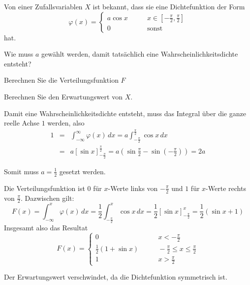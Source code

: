 Von einer Zufallsvariablen $X$ ist bekannt, dass sie eine Dichtefunktion
der Form
\[
\varphi(x)=\begin{cases}
a\cos x&\qquad x\in[-\frac{\pi}2,\frac{\pi}2]\\
0&\qquad\text{sonst}
\end{cases}
\]
hat.
\begin{teilaufgaben}
\item Wie muss $a$ gewählt werden, damit tatsächlich eine
Wahrscheinlichkeitsdichte entsteht?
\item Berechnen Sie die Verteilungsfunktion $F$
\item Berechnen Sie den Erwartungswert von $X$.
\end{teilaufgaben}


\begin{loesung}
\begin{teilaufgaben}
\item Damit eine Wahrscheinlichkeitsdichte entsteht, muss das Integral
über die ganze reelle Achse $1$ werden, also
\begin{eqnarray*}
1&=&\int_{-\infty}^\infty\varphi(x)\,dx
=a\int_{-\frac{\pi}2}^{\frac{\pi}2}\cos x\,dx\\
&=&a\left[\sin x\right]_{-\frac{\pi}2}^{\frac{\pi}2}
=a\left(\sin\frac{\pi}2 -\sin\left(-\frac{\pi}2\right)\right)
=2a
\end{eqnarray*}

Somit muss $a=\frac12$ gesetzt werden.
\item Die Verteilungsfunktion ist $0$ für $x$-Werte links von $-\frac{\pi}2$
und $1$ für $x$-Werte rechts von $\frac{\pi}2$. Dazwischen gilt:
\[
F(x)=\int_{-\infty}^x\varphi(x)\,dx
=\frac12\int_{-\frac{\pi}2}^x\cos x\,dx
=\frac12\left[\sin x\right]_{-\frac{\pi}2}^x
=\frac12(\sin x + 1)
\]
Insgesamt also das Resultat
\[
F(x)=\begin{cases}
0&\qquad x<-\frac{\pi}2\\
\frac12(1+\sin x)&\qquad -\frac{\pi}2\le x\le\frac{\pi}2\\
1&\qquad x>\frac{\pi}2
\end{cases}
\]
\item Der Erwartungswert verschwindet, da die Dichtefunktion symmetrisch ist.
\qedhere
\end{teilaufgaben}
\end{loesung}

